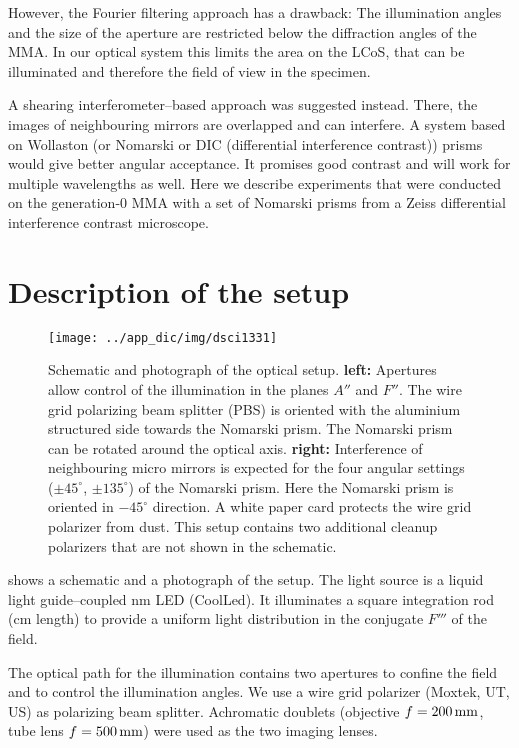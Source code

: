 However, the Fourier filtering approach has a drawback: The
illumination angles and the size of the aperture are restricted below
the diffraction angles of the MMA. In our optical system this limits
the area on the LCoS, that can be illuminated and therefore the field
of view in the specimen.

A shearing interferometer--based approach was suggested
instead. There, the images of neighbouring mirrors are overlapped and
can interfere. A system based on Wollaston (or Nomarski or DIC
(differential interference contrast)) prisms would give better angular
acceptance. It promises good contrast and will work for multiple
wavelengths as well. Here we describe experiments that were conducted
on the generation-0 MMA with a set of Nomarski prisms from a Zeiss
differential interference contrast microscope.
\section{Description of the setup}
\begin{figure}[ht]
  \centering
  \texttt{[image: ../app\_dic/img/dsci1331]}
  \caption{ Schematic and photograph of the optical setup.  {\bf
      left:} Apertures allow control of the illumination in the planes
    $A''$ and $F''$. The wire grid polarizing beam splitter (PBS) is
    oriented with the aluminium structured side towards the Nomarski
    prism. The Nomarski prism can be rotated around the optical
    axis. {\bf right:} Interference of neighbouring micro mirrors is
    expected for the four angular settings ($\pm 45^\circ$, $\pm
    135^\circ$) of the Nomarski prism.  Here the Nomarski prism is
    oriented in $-45^\circ$ direction.  A white paper card protects
    the wire grid polarizer from dust.  This setup contains two
    additional cleanup polarizers that are not shown in the
    schematic.}
  \label{fig:dic_mma}
\end{figure}
 shows a schematic and a photograph of the setup.
The light source is a liquid light guide--coupled \unit[480]{nm} LED
(CoolLed). It illuminates a square integration rod (\unit[10]{cm}
length) to provide a uniform light distribution in the conjugate
$F'''$ of the field. 

The optical path for the illumination contains two apertures to
confine the field and to control the illumination angles. We use a
wire grid polarizer (Moxtek, UT, US) as polarizing beam splitter.
Achromatic doublets (objective $f=\unit[200]{mm}$, tube lens
$f=\unit[500]{mm}$) were used as the two imaging lenses.

